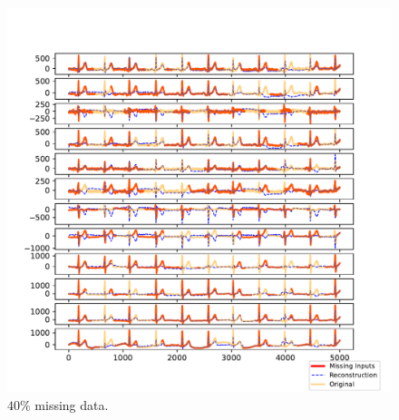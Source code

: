 \documentclass{mldsmsc}
\begin{document}
\begin{figure}[H]
\vspace{1em} %

\begin{minipage}{0.4\linewidth}
    \centering
    \includegraphics[width=\linewidth]{images/missing/tmf_output_40_10.pdf}
    \caption{$40\%$ missing data.}
\end{minipage}
\end{figure}
\end{document}

